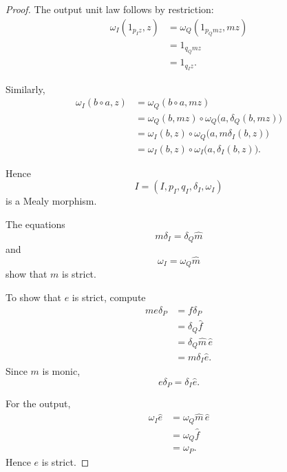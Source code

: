 \begin{proof}
    The output unit law follows by restriction:
    \[
    \begin{aligned}
        \omega_I(1_{p_Iz},z)
        &=
        \omega_Q(1_{p_Qmz},mz)
        \\
        &=
        1_{q_Qmz}
        \\
        &=
        1_{q_Iz}.
    \end{aligned}
    \]

    Similarly,
    \[
    \begin{aligned}
        \omega_I(b\circ a,z)
        &=
        \omega_Q(b\circ a,mz)
        \\
        &=
        \omega_Q(b,mz)
        \circ
        \omega_Q
        \bigl(
            a,
            \delta_Q(b,mz)
        \bigr)
        \\
        &=
        \omega_I(b,z)
        \circ
        \omega_Q
        \bigl(
            a,
            m\delta_I(b,z)
        \bigr)
        \\
        &=
        \omega_I(b,z)
        \circ
        \omega_I
        \bigl(
            a,
            \delta_I(b,z)
        \bigr).
    \end{aligned}
    \]

    Hence
    \[
        I=(I,p_I,q_I,\delta_I,\omega_I)
    \]
    is a Mealy morphism.

    The equations
    \[
        m\delta_I
        =
        \delta_Q\widehat m
    \]
    and
    \[
        \omega_I
        =
        \omega_Q\widehat m
    \]
    show that \(m\) is strict.

    To show that \(e\) is strict, compute
    \[
    \begin{aligned}
        me\delta_P
        &=
        f\delta_P
        \\
        &=
        \delta_Q\widehat f
        \\
        &=
        \delta_Q\widehat m\,\widehat e
        \\
        &=
        m\delta_I\widehat e.
    \end{aligned}
    \]
    Since \(m\) is monic,
    \[
        e\delta_P
        =
        \delta_I\widehat e.
    \]

    For the output,
    \[
    \begin{aligned}
        \omega_I\widehat e
        &=
        \omega_Q\widehat m\,\widehat e
        \\
        &=
        \omega_Q\widehat f
        \\
        &=
        \omega_P.
    \end{aligned}
    \]
    Hence \(e\) is strict.


\end{proof}
